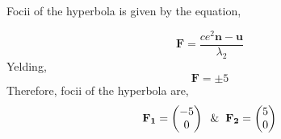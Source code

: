 \documentclass[journal,12pt,twocolumn]
{IEEEtran}
\let\vec\mathbf
\newcommand{\myvec}[1]{\ensuremath{\begin{pmatrix}#1\end{pmatrix}}}
\begin{document}
\begin{center}
Focii of the hyperbola is given by the equation,
\end{center}
\begin{equation}
\vec{F} = \frac{ce^2\vec{n}-\vec{u}}{\lambda_2}
\end{equation}
Yelding,
\begin{equation}
\vec{F} = \pm 5
\end{equation}
Therefore, focii of the hyperbola are,
\begin{equation}
\vec{F_1} = \myvec{-5 \\ 0} \hspace{2mm} \& \hspace{2mm} \vec{F_2} = \myvec{5 \\ 0}
\end{equation}
\end{document}
